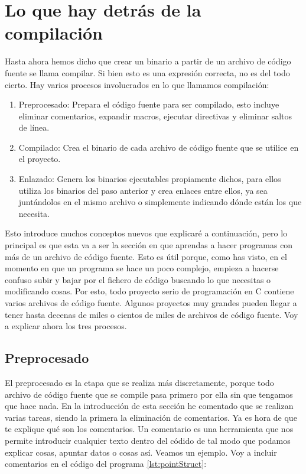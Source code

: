 \documentclass[a4paper]{article}
\begin{document}
\section{Lo que hay detrás de la compilación}
Hasta ahora hemos dicho que crear un binario a partir de un archivo de código
fuente se llama compilar. Si bien esto es una expresión correcta, no es del todo
cierto. Hay varios procesos involucrados en lo que llamamos compilación:
\begin{enumerate}
\item Preprocesado: Prepara el código fuente para ser compilado, esto incluye
eliminar comentarios, expandir macros, ejecutar directivas y eliminar saltos de
línea.
\item Compilado: Crea el binario de cada archivo de código fuente que se utilice
en el proyecto.
\item Enlazado: Genera los binarios ejecutables propiamente dichos, para ellos
utiliza los binarios del paso anterior y crea enlaces entre ellos, ya sea
juntándolos en el mismo archivo o simplemente indicando dónde están los que
necesita.
\end{enumerate}

Esto introduce muchos conceptos nuevos que explicaré a continuación, pero lo
principal es que esta va a ser la sección en que aprendas a hacer programas con
más de un archivo de código fuente. Esto es útil porque, como has visto, en el
momento en que un programa se hace un poco complejo, empieza a hacerse confuso
subir y bajar por el fichero de código buscando lo que necesitas o modificando
cosas. Por esto, todo proyecto serio de programación en C contiene varios
archivos de código fuente. Algunos proyectos muy grandes pueden llegar a tener
hasta decenas de miles o cientos de miles de archivos de código fuente.
Voy a explicar ahora los tres procesos.

\subsection{Preprocesado}
El preprocesado es la etapa que se realiza más discretamente, porque todo
archivo de código fuente que se compile pasa primero por ella sin que tengamos
que hace nada. En la introducción de esta sección he comentado que se realizan
varias tareas, siendo la primera la eliminación de comentarios. Ya es hora de
que te explique qué son los comentarios. Un comentario es una herramienta que
nos permite introducir cualquier texto dentro del códido de tal modo que podamos
explicar cosas, apuntar datos o cosas así. Veamos un ejemplo. Voy a incluir
comentarios en el código del
programa \ref {lst:pointStruct}: 
\end{document}
